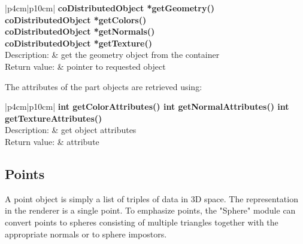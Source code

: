 \begin{longtable}{|p{4cm}|p{10cm}|}
\hline
{}
{\bf coDistributedObject *getGeometry()}\\
\hline
{}
{\bf coDistributedObject *getColors()}\\
\hline
{}
{\bf coDistributedObject *getNormals()}\\
\hline
{}
{\bf coDistributedObject *getTexture()}\\
\hline
{Description:}  
       & {get the geometry object from the container} \\
\hline
{Return value:}  
       & {pointer to requested object} \endhead
\hline       
\end{longtable}

The attributes of the part objects are retrieved using:


\begin{longtable}{|p{4cm}|p{10cm}|}
\hline
{}
{\bf int getColorAttributes() int getNormalAttributes() int getTextureAttributes()}\\
\hline
{Description:}  
       & {get object attributes} \\
\hline
{Return value:}  
       & {attribute} \endhead
\hline       
\end{longtable}

\subsection{Points}

A point object is simply a list of triples of data in 3D space. The representation 
in the renderer is a single point. To emphasize points, the "Sphere" module can 
convert points to spheres consisting of multiple triangles together with the 
appropriate normals or to sphere impostors.
					       
